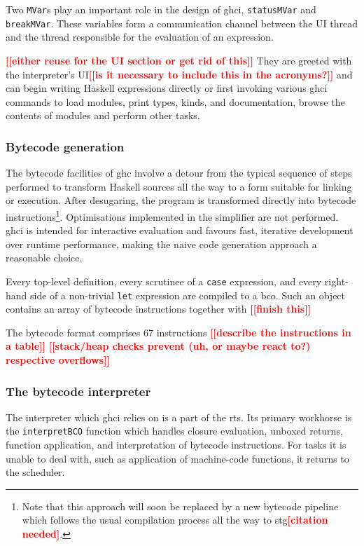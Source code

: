 \documentclass[thesis=B,english]{FITthesis}[2019/12/23]
\newcommand{\todo}[1]{\textcolor{red}{\textbf{[[#1]]}}}
\newcommand{\citationNeeded}{\textcolor{red}{\textbf{[citation needed]}}}
\newcommand{\hsType}[1]{\texttt{#1}}
\newcommand{\hsIdent}[1]{\texttt{#1}}
\newcommand{\hsCode}[1]{\texttt{#1}}
\begin{document}
Two \hsType{MVar}s play an important role in the design of \acrshort{ghci},
\hsIdent{statusMVar} and \hsIdent{breakMVar}. These variables form a
communication channel between the UI thread and the thread responsible for the
evaluation of an expression.

\todo{either reuse for the UI section or get rid of this}
They are greeted with the interpreter's UI\todo{is it necessary
to include this in the acronyms?} and can begin writing Haskell expressions
directly or first invoking various \acrshort{ghci} commands to load modules,
print types, kinds, and documentation, browse the contents of modules and
perform other tasks.

\subsubsection{Bytecode generation}
The bytecode facilities of \acrshort{ghc} involve a detour from the typical
sequence of steps performed to transform Haskell sources all the way to a form
suitable for linking or execution. After desugaring, the program is transformed
directly into bytecode instructions\footnote{Note that this approach will soon
be replaced by a new bytecode pipeline which follows the usual compilation
process all the way to \acrshort{stg}\citationNeeded.}. Optimisations
implemented in the simplifier are not performed. \acrshort{ghci} is intended
for interactive evaluation and favours fast, iterative development over runtime
performance, making the naive code generation approach a reasonable choice.

Every top-level definition, every scrutinee of a \hsCode{case} expression, and
every right-hand side of a non-trivial \hsCode{let} expression are compiled to
a \acrfull{bco}. Such an object contains an array of bytecode instructions
together with \todo{finish this}

The bytecode format comprises 67 instructions
\todo{describe the instructions in a table}
\todo{stack/heap checks prevent (uh, or maybe react to?) respective overflows}

\subsubsection{The bytecode interpreter}
The interpreter which \acrshort{ghci} relies on is a part of the
\acrshort{rts}. Its primary workhorse is the \texttt{interpretBCO} function
which handles closure evaluation, unboxed returns, function application, and
interpretation of bytecode instructions. For tasks it is unable to deal with,
such as application of machine-code functions, it returns to the scheduler.
\end{document}
